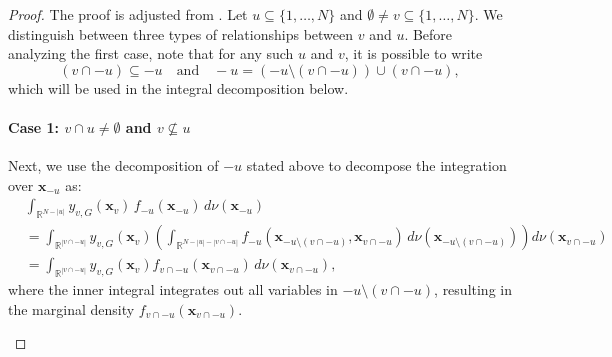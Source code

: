 \begin{proof}
The proof is adjusted from \cite{rahman2014}. Let $u \subseteq \{1,\dots,N\}$ and $\emptyset \ne v \subseteq \{1,\dots,N\}$.
We distinguish between three types of relationships between $v$ and $u$.
Before analyzing the first case, note that for any such $u$ and $v$, it is possible to write
\[
(v \cap -u) \subseteq -u \quad \text{and} \quad -u = (-u \setminus (v \cap -u)) \cup (v \cap -u),
\]
which will be used in the integral decomposition below.
\paragraph{Case 1: \( v \cap u \ne \emptyset \) and \( v \not\subseteq u \)}
Next, we use the decomposition of $-u$ stated above to decompose the integration over $\boldsymbol{x}_{-u}$ as:
\begin{equation*}
\begin{aligned}
&\int_{\mathbb{R}^{N - |u|}} 
    y_{v,G}(\boldsymbol{x}_v)\,
    f_{-u}(\boldsymbol{x}_{-u}) 
    \, d \nu(\boldsymbol{x}_{-u}) \\[3ex]
&= \int_{\mathbb{R}^{|v \cap -u|}} 
    y_{v,G}(\boldsymbol{x}_v)
    \left(
        \int_{\mathbb{R}^{N - |u| - |v \cap -u|}}
            f_{-u}(\boldsymbol{x}_{-u \setminus (v \cap -u)}, \boldsymbol{x}_{v \cap -u})
            \, d \nu(\boldsymbol{x}_{-u \setminus (v \cap -u)})
    \right) 
    d \nu(\boldsymbol{x}_{v \cap -u}) \\[3ex]
    &= \int_{\mathbb{R}^{|v \cap -u|}} y_{v,G}(\boldsymbol{x}_v) f_{v \cap -u}(\boldsymbol{x}_{v \cap -u}) \, d \nu(\boldsymbol{x}_{v \cap -u}),
\end{aligned}
\end{equation*}
where the inner integral integrates out all variables in 
$-u \setminus (v \cap -u)$, 
resulting in the marginal density 
$f_{v \cap -u}(\boldsymbol{x}_{v \cap -u})$.
\begin{center}
\end{center}

\end{proof}
